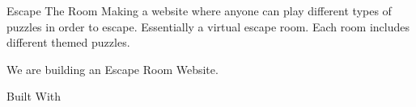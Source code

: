 Escape The Room
Making a website where anyone can play different types of puzzles in order to escape. Essentially a virtual escape room. Each room includes different themed puzzles.

We are building an Escape Room Website.

Built With
